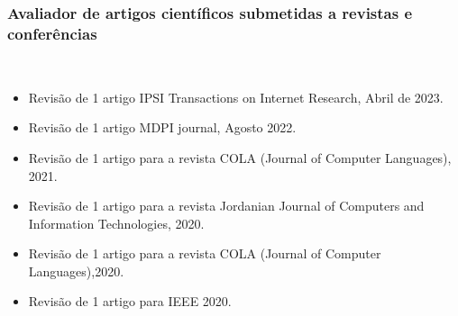\documentclass[11pt]{article}
\begin{document}
\subsubsection{Avaliador de artigos científicos submetidas a revistas e conferências}
\\
\begin{itemize}
\item {Revisão de 1 artigo IPSI Transactions on Internet Research, Abril de 2023.}
\item {Revisão de 1 artigo MDPI journal, Agosto 2022.}
\item {Revisão de 1 artigo para a revista COLA (Journal of Computer Languages), 2021.}
\item {Revisão de 1 artigo para a revista Jordanian Journal of Computers and Information Technologies, 2020.}
\item {Revisão de 1 artigo para a revista COLA (Journal of Computer Languages),2020.}
\item {Revisão de 1 artigo para IEEE 2020.}


\end{itemize}
\end{document}
